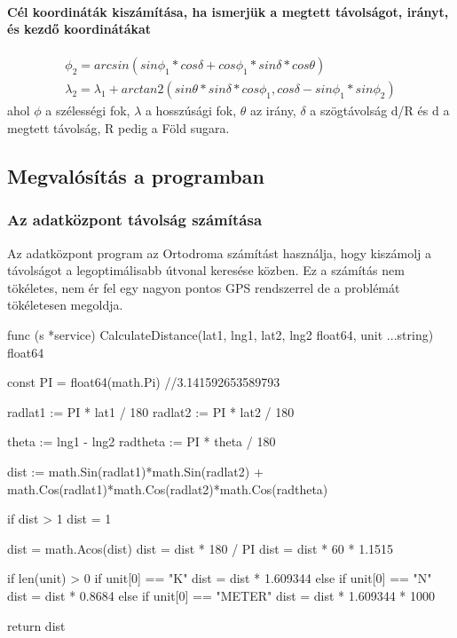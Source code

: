 \paragraph{Cél koordináták kiszámítása, ha ismerjük a megtett távolságot, irányt, és kezdő koordinátákat}
\begin{gather}
    \phi_{2} = arcsin(sin \phi_{1} * cos \delta + cos \phi_{1} * sin \delta * cos \theta)\\
    \lambda_{2} = \lambda_{1} + arctan2(sin\theta * sin\delta  * cos\phi_{1}, cos\delta - sin\phi_{1} * sin\phi_{2})
\end{gather}
ahol $\phi$ a szélességi fok, $\lambda$ a hosszúsági fok, $\theta$ az irány, $\delta$ a szögtávolság d/R és d a megtett távolság, R pedig a Föld sugara.

\subsection{Megvalósítás a programban}
\subsubsection{Az adatközpont távolság számítása}
Az adatközpont program az Ortodroma számítást használja, hogy kiszámolj a távolságot a legoptimálisabb útvonal keresése közben.
Ez a számítás nem tökéletes, nem ér fel egy nagyon pontos GPS rendszerrel de a problémát tökéletesen megoldja.
\begin{python}
    func (s *service) CalculateDistance(lat1, lng1, lat2, lng2 float64, unit ...string) float64 {
        const PI = float64(math.Pi) //3.141592653589793

        radlat1 := PI * lat1 / 180
        radlat2 := PI * lat2 / 180

        theta := lng1 - lng2
        radtheta := PI * theta / 180

        dist := math.Sin(radlat1)*math.Sin(radlat2) + math.Cos(radlat1)*math.Cos(radlat2)*math.Cos(radtheta)

        if dist > 1 {
            dist = 1
        }

        dist = math.Acos(dist)
        dist = dist * 180 / PI
        dist = dist * 60 * 1.1515

        if len(unit) > 0 {
            if unit[0] == "K" {
                dist = dist * 1.609344
            } else if unit[0] == "N" {
                dist = dist * 0.8684
            } else if unit[0] == "METER" {
                dist = dist * 1.609344 * 1000
            }
        }

        return dist
    }
\end{python}

